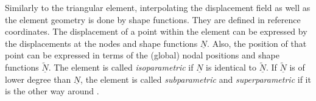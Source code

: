   Similarly to the triangular element, interpolating the displacement field as well as the element geometry is done by shape functions. They are defined in reference coordinates. The displacement of a point within the element can be expressed by the displacements at the nodes and shape functions $\underline{N}$. Also, the position of that point can be expressed in terms of the (global) nodal positions and shape functions $\underline{\tilde{N}}$. The element is called \textit{isoparametric} if $\underline{N}$ is identical to $\underline{\tilde{N}}$. If $\underline{\tilde{N}}$ is of lower degree than $\underline{N}$, the element is called \textit{subparametric} and \textit{superparametric} if it is the other way around \cite{cook2002concepts}.
  
